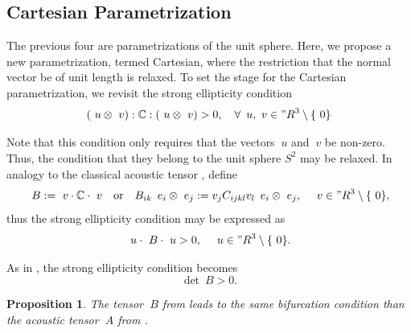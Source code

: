 \documentclass[12pt]{article}
\newtheorem{proposition}{Proposition}
\numberwithin{equation}{section}
\begin{document}
\subsection{Cartesian Parametrization}
\label{subsec:Cartesian}

The previous four are parametrizations of the unit sphere. Here, we
propose a new parametrization, termed Cartesian, where the restriction
that the normal vector be of unit length is relaxed.  To set the stage
for the Cartesian parametrization, we revisit the strong ellipticity
condition
\begin{equation}
  (~u \otimes ~v) : \mathbb{C} : (~u \otimes ~v) > 0,
  \quad
  \forall \, ~u, ~v \in {"R}^3 \setminus \{~0\}
\end{equation}

Note that this condition only requires that the vectors $~u$ and $~v
$ be non-zero. Thus, the condition that they belong to the unit sphere
$S^2$ may be relaxed. In analogy to the classical acoustic tensor
, define
\begin{equation} \label{eq:Cartesian-acoustic-tensor}
  ~B := ~v \cdot \mathbb{C} \cdot ~v
  \quad \text{or} \quad
  B_{ik} \, ~e_i \otimes ~e_j := v_j C_{ijkl} v_l  \, ~e_i \otimes ~e_j,
  \quad
  ~v \in {"R}^3 \setminus \{~0\},
\end{equation}
thus the strong ellipticity condition may be expressed as
\begin{equation} \label{eq:Cartesian-acoustic-ellipticity}
  ~u \cdot ~B \cdot ~u > 0,
  \quad
  ~u \in {"R}^3 \setminus \{~0\}.
\end{equation}

As in , the strong ellipticity
condition becomes
\begin{equation} \label{Cartesian-acoustic-determinant}
  \det ~B > 0.
\end{equation}

\begin{proposition}
  The tensor $~B$ from  leads to
  the same bifurcation condition than the acoustic tensor $~A$ from
  .
\end{proposition}
\end{document}
